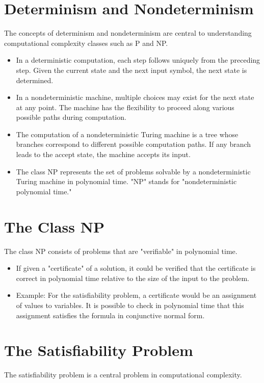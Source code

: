 \documentclass[12pt,openany]{book}
\theoremstyle{definition}
\begin{document}
\section{Determinism and Nondeterminism}
The concepts of determinism and nondeterminism are central to understanding computational complexity classes such as P and NP.

\begin{itemize}
	\item In a deterministic computation, each step follows uniquely from the preceding step. Given the current state and the next input symbol, the next state is determined.
	\item In a nondeterministic machine, multiple choices may exist for the next state at any point. The machine has the flexibility to proceed along various possible paths during computation.
	\item The computation of a nondeterministic Turing machine is a tree whose branches correspond to different possible computation paths. If any branch leads to the accept state, the machine accepts its input.
	\item The class NP represents the set of problems solvable by a nondeterministic Turing machine in polynomial time. "NP" stands for "nondeterministic polynomial time."
\end{itemize}

\section{The Class NP}
The class NP consists of problems that are "verifiable" in polynomial time.

\begin{itemize}
	\item If given a "certificate" of a solution, it could be verified that the certificate is correct in polynomial time relative to the size of the input to the problem.
	\item Example: For the satisfiability problem, a certificate would be an assignment of values to variables. It is possible to check in polynomial time that this assignment satisfies the formula in conjunctive normal form.
\end{itemize}

\section{The Satisfiability Problem}
The satisfiability problem is a central problem in computational complexity.
\end{document}
